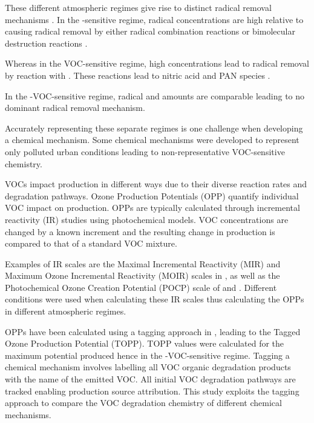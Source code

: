 These different atmospheric regimes give rise to distinct radical removal mechanisms \citep{Kleinman:1991}. 
In the -sensitive regime, radical concentrations are high relative to  causing radical removal by either radical combination reactions  or bimolecular destruction reactions  \citep{Kleinman:1994}.
\begin{reactionlist}
\end{reactionlist}
Whereas in the VOC-sensitive regime, high  concentrations lead to radical removal by reaction with . 
These reactions lead to nitric acid  and PAN species .
\begin{reactionlist}
\end{reactionlist}
In the -VOC-sensitive regime, radical and  amounts are comparable leading to no dominant radical removal mechanism. 

Accurately representing these separate regimes is one challenge when developing a chemical mechanism.
Some chemical mechanisms were developed to represent only polluted urban conditions leading to non-representative VOC-sensitive chemistry.

VOCs impact  production in different ways due to their diverse reaction rates and degradation pathways. 
Ozone Production Potentials (OPP) quantify individual VOC impact on  production. 
OPPs are typically calculated through incremental reactivity (IR) studies using photochemical models. 
VOC concentrations are changed by a known increment and the resulting change in  production is compared to that of a standard VOC mixture. 

Examples of IR scales are the Maximal Incremental Reactivity (MIR) and Maximum Ozone Incremental Reactivity (MOIR) scales in \citet{Carter:1994}, as well as the Photochemical Ozone Creation Potential (POCP) scale of \citet{Derwent:1996} and \citet{Derwent:1998}. 
Different  conditions were used when calculating these IR scales thus calculating the OPPs in different atmospheric regimes.

OPPs have been calculated using a tagging approach in \citet{Butler:2011}, leading to the Tagged Ozone Production Potential (TOPP). 
TOPP values were calculated for the maximum potential  produced hence in the -VOC-sensitive regime.
Tagging a chemical mechanism involves labelling all VOC organic degradation products with the name of the emitted VOC.
All initial VOC degradation pathways are tracked enabling  production source attribution.
This study exploits the tagging approach to compare the VOC degradation chemistry of different chemical mechanisms. 

